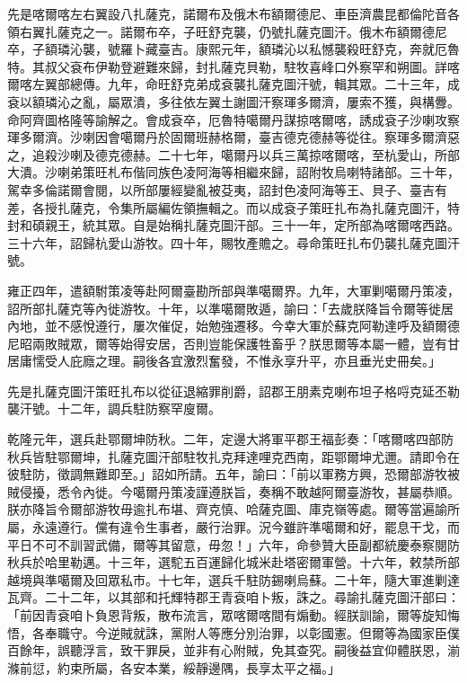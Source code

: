\begin{pinyinscope}
先是喀爾喀左右翼設八扎薩克，諾爾布及俄木布額爾德尼、車臣濟農昆都倫陀音各領右翼扎薩克之一。諾爾布卒，子旺舒克襲，仍號扎薩克圖汗。俄木布額爾德尼卒，子額璘沁襲，號羅卜藏臺吉。康熙元年，額璘沁以私憾襲殺旺舒克，奔就厄魯特。其叔父袞布伊勒登避難來歸，封扎薩克貝勒，駐牧喜峰口外察罕和朔圖。詳喀爾喀左翼部總傳。九年，命旺舒克弟成袞襲扎薩克圖汗號，輯其眾。二十三年，成袞以額璘沁之亂，屬眾潰，多往依左翼土謝圖汗察琿多爾濟，屢索不獲，與構釁。命阿齊圖格隆等諭解之。會成袞卒，厄魯特噶爾丹謀掠喀爾喀，誘成袞子沙喇攻察琿多爾濟。沙喇因會噶爾丹於固爾班赫格爾，臺吉德克德赫等從往。察琿多爾濟惡之，追殺沙喇及德克德赫。二十七年，噶爾丹以兵三萬掠喀爾喀，至杭愛山，所部大潰。沙喇弟策旺札布偕同族色凌阿海等相繼來歸，詔附牧烏喇特諸部。三十年，駕幸多倫諾爾會閱，以所部屢經變亂被芟夷，詔封色凌阿海等王、貝子、臺吉有差，各授扎薩克，令集所屬編佐領撫輯之。而以成袞子策旺扎布為扎薩克圖汗，特封和碩親王，統其眾。自是始稱扎薩克圖汗部。三十一年，定所部為喀爾喀西路。三十六年，詔歸杭愛山游牧。四十年，賜牧產贍之。尋命策旺扎布仍襲扎薩克圖汗號。

雍正四年，遣額駙策凌等赴阿爾臺勘所部與準噶爾界。九年，大軍剿噶爾丹策凌，詔所部扎薩克等內徙游牧。十年，以準噶爾敗遁，諭曰：「去歲朕降旨令爾等徙居內地，並不感悅遵行，屢次催促，始勉強遷移。今幸大軍於蘇克阿勒達呼及額爾德尼昭兩敗賊眾，爾等始得安居，否則豈能保護牲畜乎？朕思爾等本屬一體，豈有甘居庸懦受人庇廕之理。嗣後各宜激烈奮發，不惟永享升平，亦且垂光史冊矣。」

先是扎薩克圖汗策旺扎布以從征退縮罪削爵，詔郡王朋素克喇布坦子格哷克延丕勒襲汗號。十二年，調兵駐防察罕廋爾。

乾隆元年，選兵赴鄂爾坤防秋。二年，定邊大將軍平郡王福彭奏：「喀爾喀四部防秋兵皆駐鄂爾坤，扎薩克圖汗部駐牧扎克拜達哩克西南，距鄂爾坤尤邇。請即令在彼駐防，徵調無難即至。」詔如所請。五年，諭曰：「前以軍務方興，恐爾部游牧被賊侵擾，悉令內徙。今噶爾丹策凌謹遵朕旨，奏稱不敢越阿爾臺游牧，甚屬恭順。朕亦降旨令爾部游牧毋逾扎布堪、齊克慎、哈薩克圖、庫克嶺等處。爾等當遍諭所屬，永遠遵行。儻有違令生事者，嚴行治罪。況今雖許準噶爾和好，罷息干戈，而平日不可不訓習武備，爾等其留意，毋忽！」六年，命參贊大臣副都統慶泰察閱防秋兵於哈里勒邁。十三年，選駝五百運歸化城米赴塔密爾軍營。十六年，敕禁所部越境與準噶爾及回眾私市。十七年，選兵千駐防錫喇烏蘇。二十年，隨大軍進剿達瓦齊。二十二年，以其部和托輝特郡王青袞咱卜叛，誅之。尋諭扎薩克圖汗部曰：「前因青袞咱卜負恩背叛，散布流言，眾喀爾喀間有煽動。經朕訓諭，爾等旋知悔悟，各奉職守。今逆賊就誅，黨附人等應分別治罪，以彰國憲。但爾等為國家臣僕百餘年，誤聽浮言，致干罪戾，並非有心附賊，免其查究。嗣後益宜仰體朕恩，湔滌前愆，約束所屬，各安本業，綏靜邊隅，長享太平之福。」


\end{pinyinscope}
